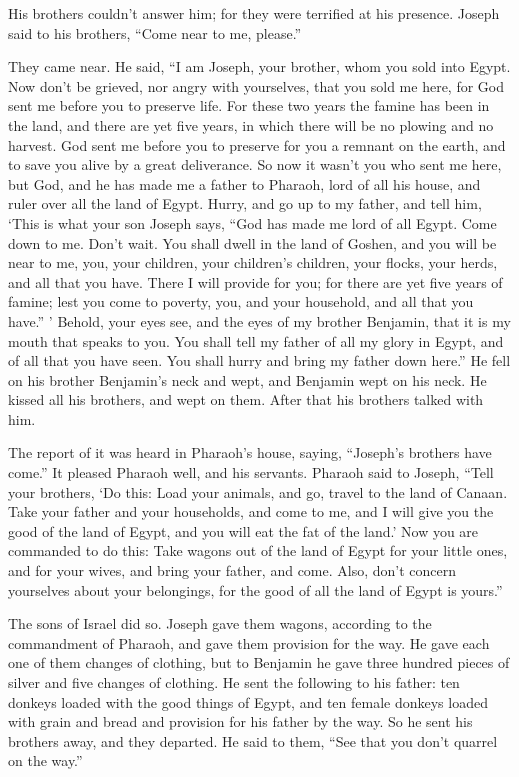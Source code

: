 His brothers couldn’t answer him; for they were terrified at his presence.  \myverse{}Joseph said to his brothers, “Come near to me, please.”

They came near. He said, “I am Joseph, your brother, whom you sold into Egypt.  \myverse{}Now don’t be grieved, nor angry with yourselves, that you sold me here, for God sent me before you to preserve life.  \myverse{}For these two years the famine has been in the land, and there are yet five years, in which there will be no plowing and no harvest.  \myverse{}God sent me before you to preserve for you a remnant on the earth, and to save you alive by a great deliverance.  \myverse{}So now it wasn’t you who sent me here, but God, and he has made me a father to Pharaoh, lord of all his house, and ruler over all the land of Egypt.  \myverse{}Hurry, and go up to my father, and tell him, ‘This is what your son Joseph says, “God has made me lord of all Egypt. Come down to me. Don’t wait.  \myverse{}You shall dwell in the land of Goshen, and you will be near to me, you, your children, your children’s children, your flocks, your herds, and all that you have.  \myverse{}There I will provide for you; for there are yet five years of famine; lest you come to poverty, you, and your household, and all that you have.” ’  \myverse{}Behold, your eyes see, and the eyes of my brother Benjamin, that it is my mouth that speaks to you.  \myverse{}You shall tell my father of all my glory in Egypt, and of all that you have seen. You shall hurry and bring my father down here.”  \myverse{}He fell on his brother Benjamin’s neck and wept, and Benjamin wept on his neck.  \myverse{}He kissed all his brothers, and wept on them. After that his brothers talked with him.

\myverse{}The report of it was heard in Pharaoh’s house, saying, “Joseph’s brothers have come.” It pleased Pharaoh well, and his servants.  \myverse{}Pharaoh said to Joseph, “Tell your brothers, ‘Do this: Load your animals, and go, travel to the land of Canaan.  \myverse{}Take your father and your households, and come to me, and I will give you the good of the land of Egypt, and you will eat the fat of the land.’  \myverse{}Now you are commanded to do this: Take wagons out of the land of Egypt for your little ones, and for your wives, and bring your father, and come.  \myverse{}Also, don’t concern yourselves about your belongings, for the good of all the land of Egypt is yours.”

\myverse{}The sons of Israel did so. Joseph gave them wagons, according to the commandment of Pharaoh, and gave them provision for the way.  \myverse{}He gave each one of them changes of clothing, but to Benjamin he gave three hundred pieces of silver and five changes of clothing.  \myverse{}He sent the following to his father: ten donkeys loaded with the good things of Egypt, and ten female donkeys loaded with grain and bread and provision for his father by the way.  \myverse{}So he sent his brothers away, and they departed. He said to them, “See that you don’t quarrel on the way.”

